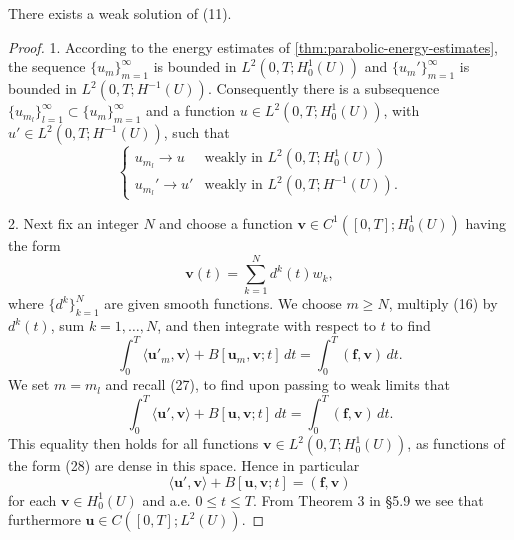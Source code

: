 \begin{theorem}
\label{thm:parabolic-existence-weak-solution}
There exists a weak solution of (11).
\end{theorem}

\begin{proof}
1. According to the energy estimates of \cref{thm:parabolic-energy-estimates}, the sequence $\{u_m\}_{m=1}^{\infty}$ is bounded in $L^2(0,T;H_0^1(U))$ and $\{u_m'\}_{m=1}^{\infty}$ is bounded in $L^2(0,T;H^{-1}(U))$. Consequently there is a subsequence $\{u_{m_l}\}_{l=1}^{\infty} \subset \{u_m\}_{m=1}^{\infty}$ and a function $u \in L^2(0,T;H_0^1(U))$, with $u' \in L^2(0,T;H^{-1}(U))$, such that
\[
\begin{cases}
u_{m_l} \to u & \text{weakly in } L^2(0,T;H_0^1(U)) \\
u_{m_l}' \to u' & \text{weakly in } L^2(0,T;H^{-1}(U)).
\end{cases}
\tag{27}
\]

2. Next fix an integer $N$ and choose a function $\mathbf{v} \in C^1([0,T]; H_0^1(U))$ having the form
\[
\mathbf{v}(t) = \sum_{k=1}^{N} d^k(t)w_k,
\tag{28}
\]
where $\{d^k\}_{k=1}^N$ are given smooth functions. We choose $m \geq N$, multiply (16) by $d^k(t)$, sum $k = 1, \ldots, N$, and then integrate with respect to $t$ to find
\[
\int_0^T \langle \mathbf{u}'_m, \mathbf{v} \rangle + B[\mathbf{u}_m, \mathbf{v}; t] \, dt = \int_0^T (\mathbf{f}, \mathbf{v}) \, dt.
\tag{29}
\]
We set $m = m_l$ and recall (27), to find upon passing to weak limits that
\[
\int_0^T \langle \mathbf{u}', \mathbf{v} \rangle + B[\mathbf{u}, \mathbf{v}; t] \, dt = \int_0^T (\mathbf{f}, \mathbf{v}) \, dt.
\tag{30}
\]
This equality then holds for all functions $\mathbf{v} \in L^2(0,T; H_0^1(U))$, as functions of the form (28) are dense in this space. Hence in particular
\[
\langle \mathbf{u}', \mathbf{v} \rangle + B[\mathbf{u}, \mathbf{v}; t] = (\mathbf{f}, \mathbf{v})
\tag{31}
\]
for each $\mathbf{v} \in H_0^1(U)$ and a.e. $0 \leq t \leq T$. From Theorem 3 in \S5.9 we see that furthermore $\mathbf{u} \in C([0,T]; L^2(U))$.


\end{proof}
